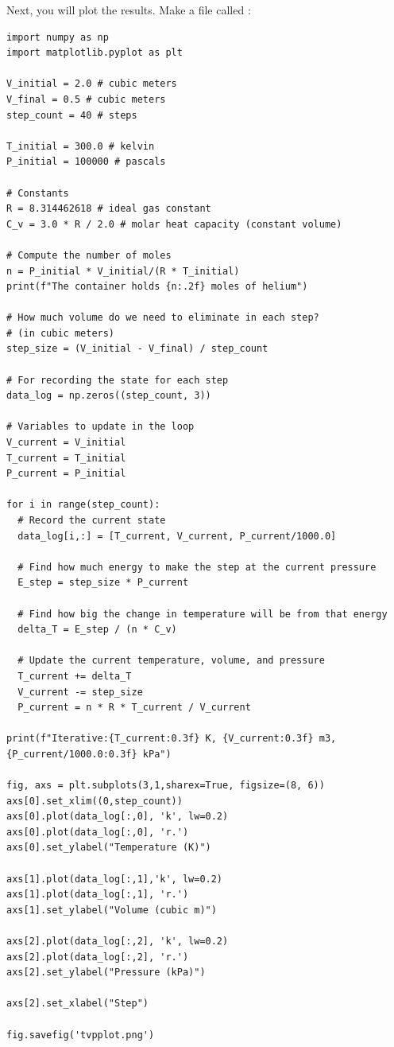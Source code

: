 Next, you will plot the results. Make a file called :

\begin{verbatim}
import numpy as np
import matplotlib.pyplot as plt

V_initial = 2.0 # cubic meters
V_final = 0.5 # cubic meters
step_count = 40 # steps

T_initial = 300.0 # kelvin
P_initial = 100000 # pascals

# Constants
R = 8.314462618 # ideal gas constant
C_v = 3.0 * R / 2.0 # molar heat capacity (constant volume)

# Compute the number of moles
n = P_initial * V_initial/(R * T_initial) 
print(f"The container holds {n:.2f} moles of helium")

# How much volume do we need to eliminate in each step? 
# (in cubic meters)
step_size = (V_initial - V_final) / step_count

# For recording the state for each step
data_log = np.zeros((step_count, 3))

# Variables to update in the loop
V_current = V_initial
T_current = T_initial
P_current = P_initial

for i in range(step_count):
  # Record the current state
  data_log[i,:] = [T_current, V_current, P_current/1000.0]

  # Find how much energy to make the step at the current pressure
  E_step = step_size * P_current

  # Find how big the change in temperature will be from that energy
  delta_T = E_step / (n * C_v)

  # Update the current temperature, volume, and pressure
  T_current += delta_T
  V_current -= step_size
  P_current = n * R * T_current / V_current

print(f"Iterative:{T_current:0.3f} K, {V_current:0.3f} m3, {P_current/1000.0:0.3f} kPa")

fig, axs = plt.subplots(3,1,sharex=True, figsize=(8, 6))
axs[0].set_xlim((0,step_count))
axs[0].plot(data_log[:,0], 'k', lw=0.2)
axs[0].plot(data_log[:,0], 'r.')
axs[0].set_ylabel("Temperature (K)")

axs[1].plot(data_log[:,1],'k', lw=0.2)
axs[1].plot(data_log[:,1], 'r.')
axs[1].set_ylabel("Volume (cubic m)")

axs[2].plot(data_log[:,2], 'k', lw=0.2)
axs[2].plot(data_log[:,2], 'r.')
axs[2].set_ylabel("Pressure (kPa)")

axs[2].set_xlabel("Step")

fig.savefig('tvpplot.png')
\end{verbatim}

